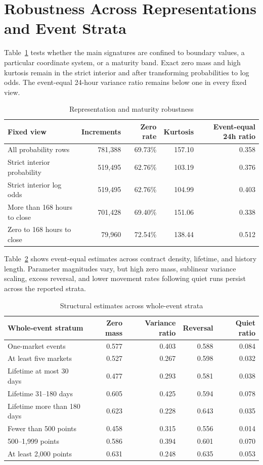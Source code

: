 \documentclass[11pt]{article}
\begin{document}
\section{Robustness Across Representations and Event Strata}

Table~\ref{tab:representation} tests whether the main signatures are confined to boundary values,
a particular coordinate system, or a maturity band. Exact zero mass and high kurtosis remain in
the strict interior and after transforming probabilities to log odds. The event-equal 24-hour
variance ratio remains below one in every fixed view.

\begin{table}[htbp]
\centering
\caption{Representation and maturity robustness}
\label{tab:representation}
\begin{tabular}{lrrrr}
\toprule
Fixed view & Increments & Zero rate & Kurtosis & Event-equal 24h ratio \\
\midrule
All probability rows & 781,388 & 69.73\% & 157.10 & 0.358 \\
Strict interior probability & 519,495 & 62.76\% & 103.19 & 0.376 \\
Strict interior log odds & 519,495 & 62.76\% & 104.99 & 0.403 \\
More than 168 hours to close & 701,428 & 69.40\% & 151.06 & 0.338 \\
Zero to 168 hours to close & 79,960 & 72.54\% & 138.44 & 0.512 \\
\bottomrule
\end{tabular}
\end{table}

Table~\ref{tab:strata} shows event-equal estimates across contract density, lifetime, and history
length. Parameter magnitudes vary, but high zero mass, sublinear variance scaling, excess
reversal, and lower movement rates following quiet runs persist across the reported strata.

\begin{table}[htbp]
\centering
\caption{Structural estimates across whole-event strata}
\label{tab:strata}
\begin{tabular}{lrrrr}
\toprule
Whole-event stratum & Zero mass & Variance ratio & Reversal & Quiet ratio \\
\midrule
One-market events & 0.577 & 0.403 & 0.588 & 0.084 \\
At least five markets & 0.527 & 0.267 & 0.598 & 0.032 \\
Lifetime at most 30 days & 0.477 & 0.293 & 0.581 & 0.038 \\
Lifetime 31--180 days & 0.605 & 0.425 & 0.594 & 0.078 \\
Lifetime more than 180 days & 0.623 & 0.228 & 0.643 & 0.035 \\
Fewer than 500 points & 0.458 & 0.315 & 0.556 & 0.014 \\
500--1,999 points & 0.586 & 0.394 & 0.601 & 0.070 \\
At least 2,000 points & 0.631 & 0.248 & 0.635 & 0.053 \\
\bottomrule
\end{tabular}
\end{table}
\end{document}
